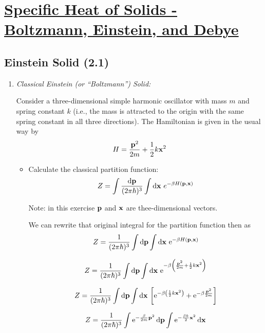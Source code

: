 \section[Specific Heat of Solids - Boltzmann, Einstein, and Debye]{\hyperlink{toc}{Specific Heat of Solids - Boltzmann, Einstein, and Debye}}



\subsection{Einstein Solid (2.1)}

\begin{enumerate}[label=(\alph*)]
    \item \textit{Classical Einstein (or “Boltzmann”) Solid:}

    Consider a three-dimensional simple harmonic oscillator with mass $m$ and spring constant $k$ (i.e., the mass is attracted to the origin with the same spring constant in all three directions). The Hamiltonian is given in the usual way by
    \[
    H = \frac{\vb{p}^2}{2m} + \frac{1}{2} k \vb{x}^2
    \]
    
    \begin{itemize}
        \item Calculate the classical partition function:
        \[
        Z = \int \frac{\dd{\vb{p}}}{(2\pi \hbar)^3} \int \dd{\vb{x}} \, e^{-\beta H(\vb{p}, \vb{x})}
        \]

        Note: in this exercise $\vb{p}$ and $\vb{x}$ are thee-dimensional vectors.

        \divider
        
        We can rewrite that original integral for the partition function then as
        \[
        Z = \recip{(2\pi \hbar)^3} \int \dd{\vb{p}} \int \dd{\vb{x}} \, \e^{-\beta H(\vb{p}, \vb{x})}
        \]

        
        \[
        Z = \recip{(2\pi \hbar)^3} \int \dd{\vb{p}} \int \dd{\vb{x}} \, \e^{-\beta \paren*{ \frac{\vb{p}^2}{2m} + \frac{1}{2} k \vb{x}^2}}
        \]

        \[
        Z = \recip{(2\pi \hbar)^3} \int \dd{\vb{p}} \int \dd{\vb{x}} \, \brackets*{ \e^{-\beta \paren*{\frac{1}{2} k \vb{x}^2}} + \e^{-\beta \frac{\vb{p}^2}{2m}}}
        \]

        \[
        Z = \recip{(2\pi \hbar)^3} \int \e^{-\frac{\beta}{2m} \vb{p}^2} 
        \dd{\vb{p}} \int \e^{-\frac{\beta k}{2} \vb{x}^2} \dd{\vb{x}}
        \]
        


\end{itemize}
\end{enumerate}
